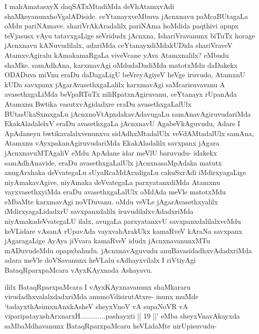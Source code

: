 
\begin{artha}
I mahAmatasxyX daqSATxMtadiMda deVhAtamxvAdi shaMkeyanunx\break hoVgalADiside. ceYtanayxveMbuva jAcnxnavu paMcaBUtagaLa oMdu pariNAmave. shariVrAkAradalilx pariNAma hoMdida paqthivi apupx teVjasusx vAyu tatavxgaLige seVridudx jAcnxna, IshariVravanunx biTuTx horage jAcnxnavu kANuvudilalx, adariMda ceYtanayxdiMdakUDida shariVraveV AtamxvAgiralu kAmakamaRgaLa viveVcane yAva Atamxnalilx? eMbudu shaMke. samAdhAna, karxmavAgi oMdudaDadiMda matotxMdu daDakekx ODADuva miVnu eraDu daDagaLigU beVreyAgiyeV heVge iruvudo, AtamxnU kUDa savxpanx jAgarAvasethxgaLalilx karxmavAgi saMcarisuvavanu A avasethxgaLiMda beVpaRTuTx niliRpatxnAgiruvanu, ceYtanayx rUpanAda Atamxnu Bwtika vasutxvAgidadxre eraDu avasethxgaLalUlx BUtasUkaSxmxgaLu jAcnxnoVtApxdakavAdavugaLu samAnavAgiruvudariMda EkakAladalelxV eraDu avasethxgaLa jAcnxnavU AgabeVkAguvudu, Adare I ApAdaneyu bwtikavalalxvenunxva sidAdhxMtadalUlx  veVdAMtadalUlx samAna, Atamxnu vAyxpakanAgiruvudariMda EkakAladalilx savxpanx jAgara jAcnxnavuMTAgaliV eMdu ApAdane idar meVlU baruvudu- idakekx samAdhAnavide, eraDu avasethxgaLalUlx jAcnxnasaMpAdaka matutx anugArxhaka deVvategaLu sUyaRcaMdArxdigaLu cakuSxrAdi iMdirxyagaLige niyAmakavAgive, niyAmaka deVvategaLa parxyatanxdiMda Atamxnu vayxvasethxyiMda eraDu avasethxgaLalUlx oMdAda meVle matotxMdu eMbaMte karxmavAgi noVDuvanu. oMdu veVLe jAgarAvasethxyalilx iMdirxyagaLidadxrU savxpanxdalilx iruvudilalxvAdadxriMda niyAmaka\break deVvategaLU ilalx, avugaLa parxyatanxvU savxpanxdalilalxveMdu keVLidare vAsanA rUpavAda vayxvahArakUkx kamaRveV kAraNa savxpanx jAgaragaLige AyAya jiVvara kamaRveV idudx jAcnxnavanunxMTu mADuvudeMdu opapxbahudu. jAcnxnavAguvudu anuBavasidadhxvAdadxriMda adara meVle doVSavanunx heVLalu sAdhayxvilalx I riVtiyAgi BataqRparxpaMcara vAyxKAyxnada Ashayavu. 
\end{artha}%


\begin{artha}
ililx BataqRparxpaMcara I vAyxKAyxnavanunx shaMkararu virudadhxvalalxdadxriMda anumoVdisirutAtxre- inunx muMde `tadayxthA\s simxnAnxkAsheV sheyxVnoV vA supaNoVR vA viparipatayxshArxnarxH.............pashayxti || 19 ||' eMba sheyxVnavAkayxda saMbaMdhavanunx BataqRparxpaMcaru heVLidaMte nirUpisuvudu-
\end{artha}


